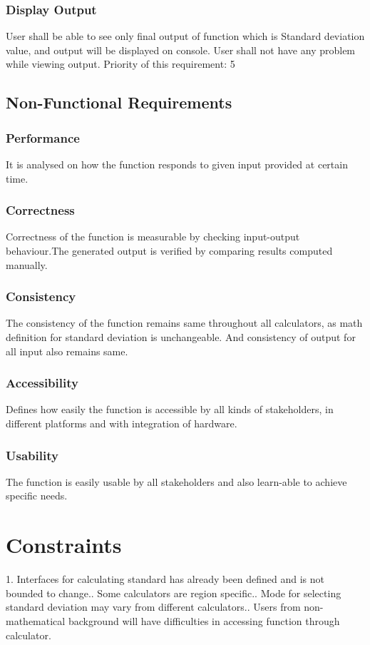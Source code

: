 \documentclass{article}
\begin{document}
\begin{titlepage}
\subsubsection{Display Output}
User shall be able to see only final output of function which is Standard deviation value, and output will be displayed on console. User shall not have any problem while viewing output. \newline
Priority of this requirement: 5
\subsection{Non-Functional Requirements}
\subsubsection{Performance}
It is analysed on how the function responds to given input provided at certain time. 
\subsubsection{Correctness}
Correctness of the function is measurable by checking input-output behaviour.The generated output is verified by comparing results computed manually.
\subsubsection{Consistency}
The consistency of the function remains same throughout all calculators, as math definition for standard deviation is unchangeable. And consistency of output for all input also remains same.
\subsubsection{Accessibility}
Defines how easily the function is accessible by all kinds of stakeholders, in different platforms and with integration of hardware.
\subsubsection{Usability}
The function is easily usable by all stakeholders and also learn-able to achieve specific needs.

\section{Constraints}
1.	Interfaces for calculating standard has already been defined and is not bounded to change..	Some calculators are region specific..  Mode for selecting standard deviation may vary from different calculators..  Users from non-mathematical background will have difficulties in accessing function through calculator.


\end{titlepage}
\end{document}
